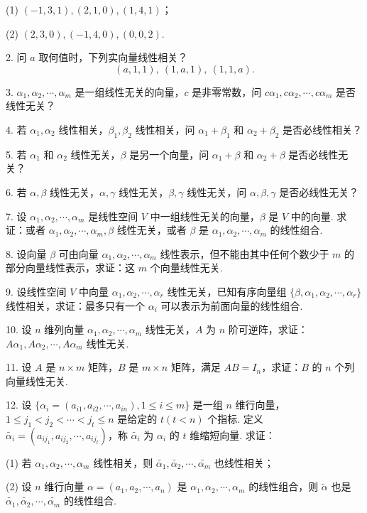 \documentclass[UTF8, 12pt, fontset=fandol, oneside]{ctexart}
\begin{document}
(1) $(-1,3,1),(2,1,0),(1,4,1)$；

(2) $(2,3,0),(-1,4,0),(0,0,2)$.

2. 问 $a$ 取何值时，下列实向量线性相关？
\[
(a,1,1),\ (1,a,1),\ (1,1,a).
\]

3. $\alpha_1,\alpha_2,\cdots,\alpha_m$ 是一组线性无关的向量，$c$ 是非零常数，问 $c\alpha_1,c\alpha_2,\cdots,c\alpha_m$ 是否线性无关？

4. 若 $\alpha_1,\alpha_2$ 线性相关，$\beta_1,\beta_2$ 线性相关，问 $\alpha_1+\beta_1$ 和 $\alpha_2+\beta_2$ 是否必线性相关？

5. 若 $\alpha_1$ 和 $\alpha_2$ 线性无关，$\beta$ 是另一个向量，问 $\alpha_1+\beta$ 和 $\alpha_2+\beta$ 是否必线性无关？

6. 若 $\alpha,\beta$ 线性无关，$\alpha,\gamma$ 线性无关，$\beta,\gamma$ 线性无关，问 $\alpha,\beta,\gamma$ 是否必线性无关？

7. 设 $\alpha_1,\alpha_2,\cdots,\alpha_m$ 是线性空间 $V$ 中一组线性无关的向量，$\beta$ 是 $V$ 中的向量. 求证：或者 $\alpha_1,\alpha_2,\cdots,\alpha_m,\beta$ 线性无关，或者 $\beta$ 是 $\alpha_1,\alpha_2,\cdots,\alpha_m$ 的线性组合.

8. 设向量 $\beta$ 可由向量 $\alpha_1,\alpha_2,\cdots,\alpha_m$ 线性表示，但不能由其中任何个数少于 $m$ 的部分向量线性表示，求证：这 $m$ 个向量线性无关.

9. 设线性空间 $V$ 中向量 $\alpha_1,\alpha_2,\cdots,\alpha_r$ 线性无关，已知有序向量组 $\{\beta,\alpha_1,\alpha_2,\cdots,\alpha_r\}$ 线性相关，求证：最多只有一个 $\alpha_i$ 可以表示为前面向量的线性组合.

10. 设 $n$ 维列向量 $\alpha_1,\alpha_2,\cdots,\alpha_m$ 线性无关，$A$ 为 $n$ 阶可逆阵，求证：$A\alpha_1,A\alpha_2,\cdots,A\alpha_m$ 线性无关.

11. 设 $A$ 是 $n\times m$ 矩阵，$B$ 是 $m\times n$ 矩阵，满足 $AB=I_n$，求证：$B$ 的 $n$ 个列向量线性无关.

12. 设 $\{\alpha_i=(a_{i1},a_{i2},\cdots,a_{in}),1\leq i\leq m\}$ 是一组 $n$ 维行向量，$1\leq j_1<j_2<\cdots<j_t\leq n$ 是给定的 $t(t<n)$ 个指标. 定义 $\widetilde{\alpha_i}=(a_{ij_1},a_{ij_2},\cdots,a_{ij_t})$，称 $\widetilde{\alpha_i}$ 为 $\alpha_i$ 的 $t$ 维缩短向量. 求证：

(1) 若 $\alpha_1,\alpha_2,\cdots,\alpha_m$ 线性相关，则 $\widetilde{\alpha_1},\widetilde{\alpha_2},\cdots,\widetilde{\alpha_m}$ 也线性相关；

(2) 设 $n$ 维行向量 $\alpha=(a_1,a_2,\cdots,a_n)$ 是 $\alpha_1,\alpha_2,\cdots,\alpha_m$ 的线性组合，则 $\widetilde{\alpha}$ 也是 $\widetilde{\alpha_1},\widetilde{\alpha_2},\cdots,\widetilde{\alpha_m}$ 的线性组合.
\end{document}
